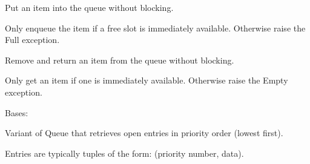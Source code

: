 \documentclass[letterpaper,10pt,english]{sphinxmanual}
\begin{document}
\begin{fulllineitems}
\begin{fulllineitems}
\label{\detokenize{queue:queue.Queue.put_nowait}}
\pysigstartsignatures
{}
\pysigstopsignatures
\sphinxAtStartPar
Put an item into the queue without blocking.

\sphinxAtStartPar
Only enqueue the item if a free slot is immediately available.
Otherwise raise the Full exception.

\end{fulllineitems}


\begin{fulllineitems}
\label{\detokenize{queue:queue.Queue.get_nowait}}
\pysigstartsignatures
{}
\pysigstopsignatures
\sphinxAtStartPar
Remove and return an item from the queue without blocking.

\sphinxAtStartPar
Only get an item if one is immediately available. Otherwise
raise the Empty exception.

\end{fulllineitems}


\end{fulllineitems}


\begin{fulllineitems}
\label{\detokenize{queue:queue.PriorityQueue}}
\pysigstartsignatures
{}
\pysigstopsignatures
\sphinxAtStartPar
Bases: {\hyperref[\detokenize{queue:queue.Queue}]{}}

\sphinxAtStartPar
Variant of Queue that retrieves open entries in priority order (lowest first).

\sphinxAtStartPar
Entries are typically tuples of the form:  (priority number, data).

\end{fulllineitems}

\end{document}
